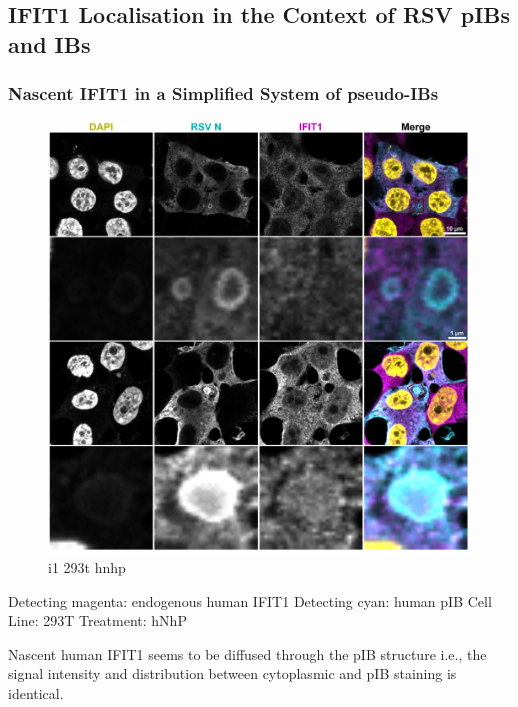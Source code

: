 \subsection{IFIT1 Localisation in the Context of RSV pIBs and IBs} \label{subsec:IFIT1 Localisation in the Context of RSV pIBs and IBs}
\subsubsection{Nascent IFIT1 in a Simplified System of pseudo-IBs} \label{Nascent IFIT1 in a Simplified System of pseudo-IBs}

\begin{figure}
    \centering
    \includegraphics[width=1\linewidth]{09. Chapter 4/Figs/03. IFIT1/01. endo_human.pdf}
    \caption[i1 293t hnhp]{i1 293t hnhp}
    \label{fig:i1 293t hnhp}
\end{figure}

Detecting magenta: endogenous human IFIT1 \newline
Detecting cyan: human pIB \newline
Cell Line: 293T \newline
Treatment: hNhP \newline

Nascent human IFIT1 seems to be diffused through the pIB structure i.e., the signal intensity and distribution between cytoplasmic and pIB staining is identical.  

